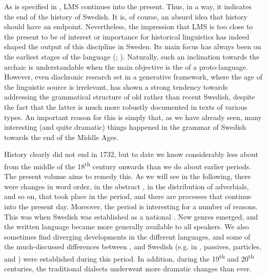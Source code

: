 \documentclass[output=paper]{langscibook}
\begin{document}
As is specified in , LMS continues into the present. Thus, in a way, it indicates the end of the history of Swedish. It is, of course, an absurd idea that history should have an endpoint. Nevertheless, the impression that LMS is too close to the present to be of interest or importance for historical linguistics has indeed shaped the output of this discipline in Sweden. Its main focus has always been on the earliest stages of the language (\citealt{Wollin1988}; \citealt{Haapamaki2010}). Naturally, such an inclination towards the archaic is understandable when the main objective is the  of a proto-language. However, even diachronic research set in a generative framework, where the age of the linguistic source is irrelevant, has shown a strong tendency towards addressing the grammatical structure of old rather than recent Swedish, despite the fact that the latter is much more robustly documented in texts of various types. An important reason for this is simply that, as we have already seen, many interesting (and quite dramatic) things happened in the grammar of Swedish towards the end of the Middle Ages.



History clearly did not end in 1732, but to date we know considerably less about  from the middle of the 18\textsuperscript{th} century onwards than we do about earlier periods. The present volume aims to remedy this. As we will see in the following, there were changes in word order, in the abstract , in the distribution of adverbials, and so on, that took place in the  period, and there are  processes that continue into the present day. Moreover, the  period is interesting for a number of reasons. This was when Swedish was established as a national . New genres emerged, and the written language became more generally available to all speakers. We also sometimes find diverging developments in the different  languages, and some of the much-discussed differences between ,  and Swedish (e.g. in , passives, particles, and ) were established during this period. In addition, during the 19\textsuperscript{th} and 20\textsuperscript{th} centuries, the traditional dialects underwent more dramatic changes than ever. 
\end{document}
